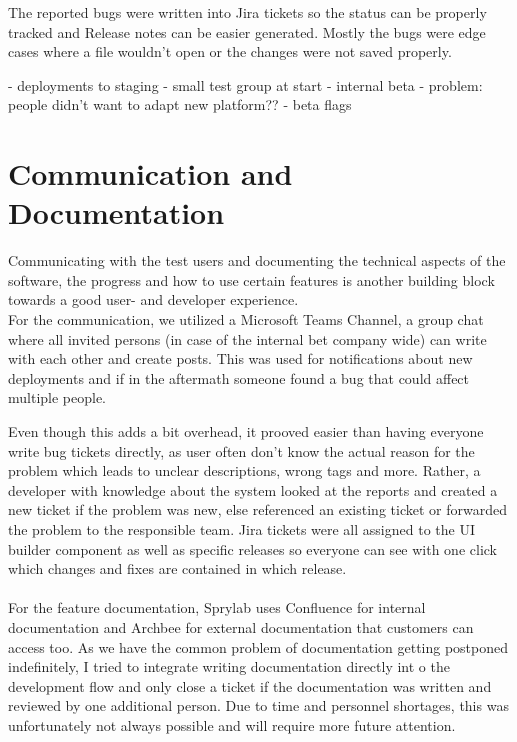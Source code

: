 The reported bugs were written into Jira tickets so the status can be properly tracked and Release notes can be easier generated.
Mostly the bugs were edge cases where a file wouldn't open or the changes were not saved properly.

- deployments to staging
- small test group at start
- internal beta
 - problem: people didn't want to adapt new platform??
- beta flags

\section{Communication and Documentation}
Communicating with the test users and documenting the technical aspects of the software, the progress and how to use certain features is
another building block towards a good user- and developer experience.
\\
For the communication, we utilized a Microsoft Teams Channel, a group chat where all invited persons (in case of the internal bet company wide) can write with each other and create posts.
This was used for notifications about new deployments and if in the aftermath someone found a bug that could affect multiple people.

Even though this adds a bit overhead, it prooved easier than having everyone write bug tickets directly, as user often don't know the actual reason for the problem which leads to unclear descriptions, wrong tags and more.
Rather, a developer with knowledge about the system looked at the reports and created a new ticket if the problem was new, else referenced an existing ticket or forwarded the problem to the responsible team.
Jira tickets were all assigned to the UI builder component as well as specific releases so everyone can see with one click which changes and fixes are contained in which release.
\\\\
For the feature documentation, Sprylab uses Confluence for internal documentation and Archbee for external documentation that customers can access too.
As we have the common problem of documentation getting postponed indefinitely, I tried to integrate writing documentation directly int o the development flow and only close a ticket if the documentation
was written and reviewed by one additional person. Due to time and personnel shortages, this was unfortunately not always possible and will require more future attention.

